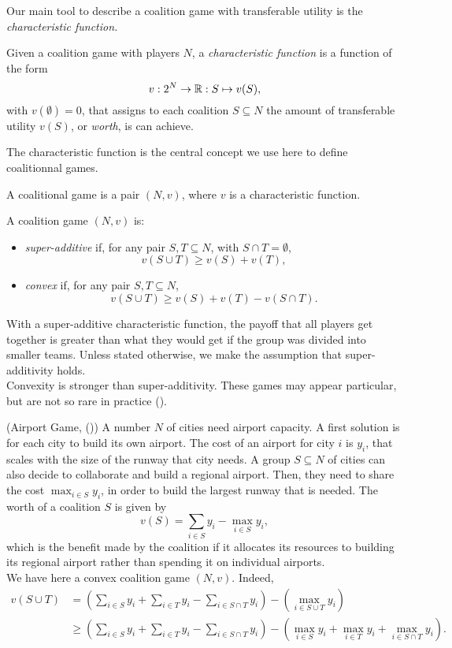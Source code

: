 Our main tool to describe a coalition game with transferable utility is the \emph{characteristic function.}
\begin{definition}
Given a coalition game with players $N$, a \emph{characteristic function} is a function of the form
$$v : 2^N \rightarrow \mathbb{R}: S \mapsto v(S), $$
with $v(\emptyset) = 0$, that assigns to each coalition $S \subseteq N$ the amount of transferable utility $v(S)$, or \emph{worth}, is can achieve. \\
\end{definition}
The characteristic function is the central concept we use here to define coalitionnal games.
\begin{definition}
A coalitional game is a pair $(N,v)$, where $v$ is a characteristic function.
\end{definition}
\begin{definition}
A coalition game $(N,v)$ is:
\begin{itemize}
\item \emph{super-additive} if, for any pair $S,T \subseteq N$, with $S \cap T = \emptyset$,
$$v(S \cup T) \geq v(S) + v(T), $$
\item \emph{convex} if,  for any pair $S,T \subseteq N$,
$$v(S \cup T) \geq v(S) + v(T) - v(S \cap T). $$
\end{itemize}
\end{definition}
With a super-additive characteristic function, the payoff that all players get together is greater than what they would get if the group was divided into smaller teams. Unless stated otherwise, we make the assumption that super-additivity holds.\\
Convexity is stronger than super-additivity. These games may appear particular, but are not so rare in practice (\cite{ShLeMSAG}).
\begin{example}(Airport Game,  (\cite{ShLeMSAG}))
A number $N$ of cities need airport capacity.
A first solution is for each city to build its own airport. The cost of an airport for city $i$ is $y_i$, that scales with the size of the runway that city needs.
A group $S \subseteq N$ of cities can also decide to collaborate and build a regional airport. Then, they need to share the cost $\max_{i \in S} y_i$, in order to build the largest runway that is needed.
The worth of a coalition $S$ is given by
$$ v(S) = \sum_{i \in S}y_i - \max_{i \in S} y_i, $$
which is the benefit made by the coalition if it allocates its resources to building its regional airport rather than spending it on individual airports.\\

We have here a convex coalition game $(N,v)$.
Indeed,
$$
\begin{aligned}
v(S \cup T) & =  \left (\sum_{i \in S} y_i + \sum_{i \in T} y_i - \sum_{i \in S \cap T} y_i \right) - \left ( \max_{i \in S \cup T } y_i \right ) \\
& \geq  \left (\sum_{i \in S} y_i + \sum_{i \in T} y_i - \sum_{i \in S \cap T} y_i \right ) - \left (  \max_{i \in S  } y_i + \max_{i \in T} y_i + \max_{i \in S \cap T} y_i \right ).
\end{aligned}
$$
\label{example:airport}
\end{example}
